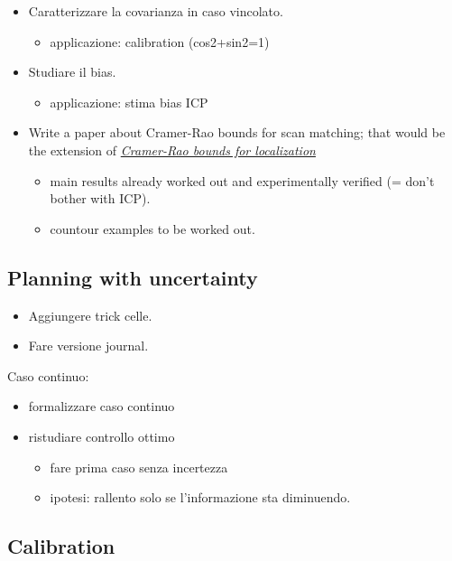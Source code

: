 \documentclass{article}
\begin{document}
\begin{itemize}%
\item Caratterizzare la covarianza in caso vincolato.

\begin{itemize}%
\item applicazione: calibration (cos{\tt {}}2+sin{\tt {}}2=1)

\end{itemize}

\item Studiare il bias.

\begin{itemize}%
\item applicazione: stima bias ICP

\end{itemize}

\item Write a paper about Cramer-Rao bounds for scan matching; that would be the extension of \href{http://purl.org/censi/2006/accuracy}{\emph{Cramer-Rao bounds for localization}}

\begin{itemize}%
\item main results already worked out and experimentally verified (= don'{}t bother with ICP).
\item countour examples to be worked out.

\end{itemize}


\end{itemize}
\hypertarget{planning_with_uncertainty}{}\subsection*{{Planning with uncertainty}}\label{planning_with_uncertainty}

\begin{itemize}%
\item Aggiungere trick celle.
\item Fare versione journal.

\end{itemize}
Caso continuo:

\begin{itemize}%
\item formalizzare caso continuo


\item ristudiare controllo ottimo

\begin{itemize}%
\item fare prima caso senza incertezza
\item ipotesi: rallento solo se l'{}informazione sta diminuendo.

\end{itemize}


\end{itemize}
\hypertarget{calibration}{}\subsection*{{Calibration}}\label{calibration}
\end{document}
